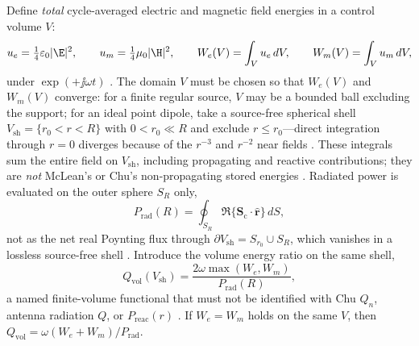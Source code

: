 Define \emph{total} cycle-averaged electric and magnetic field energies in a control volume $V$:
\[
u_e=\tfrac14\varepsilon_0|\E|^2,\qquad u_m=\tfrac14\mu_0|\H|^2,
\qquad
W_e(V)=\int_V u_e\,dV,\qquad W_m(V)=\int_V u_m\,dV,
\]
under $\exp(+\jj\omega t)$ \cite{stratton1941,harrington2001}. The domain $V$ must be chosen so that $W_e(V)$ and $W_m(V)$ converge: for a finite regular source, $V$ may be a bounded ball excluding the support; for an ideal point dipole, take a source-free spherical shell $V_{\mathrm{sh}}=\{r_0<r<R\}$ with $0<r_0\ll R$ and exclude $r\le r_0$---direct integration through $r=0$ diverges because of the $r^{-3}$ and $r^{-2}$ near fields \cite{stratton1941,yaghjian1980dyadic}. These integrals sum the entire field on $V_{\mathrm{sh}}$, including propagating and reactive contributions; they are \emph{not} McLean's or Chu's non-propagating stored energies \cite{chu1948,mcclean1996}. Radiated power is evaluated on the outer sphere $S_R$ only,
\begin{equation}
\label{eq:ch1.qvol-prad-outer}
P_{\mathrm{rad}}(R)=\oint_{S_R}\Re\{\mathbf{S}_\mathrm{c}\cdot\hat{\mathbf{r}}\}\,dS,
\end{equation}
not as the net real Poynting flux through $\partial V_{\mathrm{sh}}=S_{r_0}\cup S_R$, which vanishes in a lossless source-free shell \cite{poynting1884,stratton1941}. Introduce the volume energy ratio on the same shell,
\begin{equation}
\label{eq:ch1.chu-q-adopted}
Q_{\mathrm{vol}}(V_{\mathrm{sh}})=\frac{2\omega\max(W_e,W_m)}{P_{\mathrm{rad}}(R)},
\end{equation}
a named finite-volume functional that must not be identified with Chu $Q_n$, antenna radiation $Q$, or $P_{\mathrm{reac}}(r)$ \cite{chu1948,mcclean1996}. If $W_e=W_m$ holds on the same $V$, then $Q_{\mathrm{vol}}=\omega(W_e+W_m)/P_{\mathrm{rad}}$.

